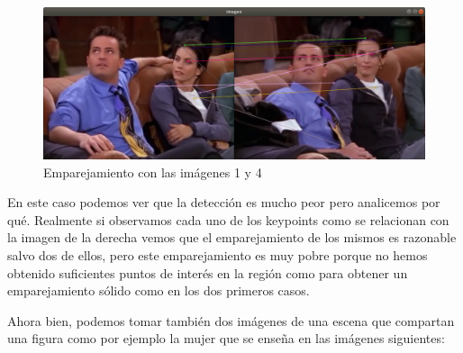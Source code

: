 \documentclass[12pt,a4paper]{article}
\begin{document}
\begin{figure}[H]
  \centering
  \includegraphics[scale=0.35]{./Imagenes/Ejercicio1-3.png}
  \caption{Emparejamiento con las imágenes 1 y 4}
\end{figure}

En este caso podemos ver que la detección es mucho peor pero analicemos por qué. Realmente si observamos cada uno de los keypoints como se relacionan con la imagen de la derecha vemos que el emparejamiento de los mismos es razonable salvo dos de ellos, pero este emparejamiento es muy pobre porque no hemos obtenido suficientes puntos de interés en la región como para obtener un emparejamiento sólido como en los dos primeros casos.

\vspace{10px}

Ahora bien, podemos tomar también dos imágenes de una escena que compartan una figura como por ejemplo la mujer que se enseña en las imágenes siguientes:
\end{document}

